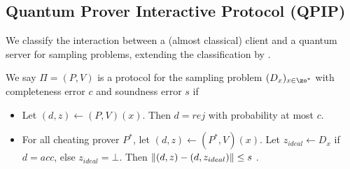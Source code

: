 \subsection{Quantum Prover Interactive Protocol (QPIP)}
We classify the interaction between a (almost classical) client and a quantum server for sampling problems, extending the classification by \cite{FOCS:Mahadev18a}.

\begin{definition}
	We say $\Pi=(P, V)$ is a protocol for the sampling problem $(D_x)_{x\in\zo^*}$ with completeness error $c$ and soundness error $s$  if
	\begin{itemize}
		\item Let $(d, z)\leftarrow(P, V)(x)$. Then $d=rej$ with probability at most $c$.
		\item For all cheating prover $P^*$, let $(d, z)\leftarrow(P^*, V)(x)$. Let  $z_{ideal}\leftarrow D_x$ if $d=acc$, else $z_{ideal}=\bot$. Then $\left\lVert(d, z) - (d, z_{ideal})\right\rVert \leq s$ .
	\end{itemize} 
\end{definition}




